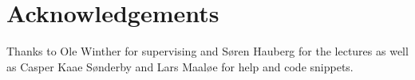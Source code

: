 \section{Acknowledgements}
\label{sec:acknowledgements}

Thanks to Ole Winther for supervising and Søren Hauberg for the lectures as well as Casper Kaae Sønderby and Lars Maaløe for help and code snippets.
